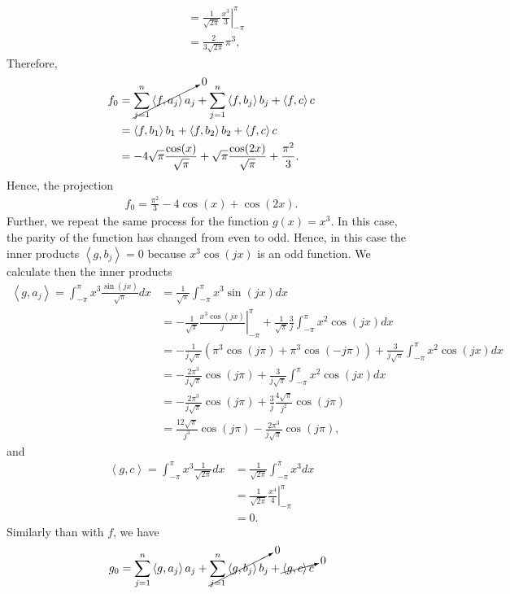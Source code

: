 \begin{questions}
\begin{solution}
\begin{align*}
&=\frac{1}{\sqrt{2\pi}}\left.\frac{x^3}{3}\right|_{-\pi}^{\pi} \\
&=\frac{2}{3\sqrt{2\pi}}\pi^3,
\end{align*}
Therefore,
\begin{align*}
f_0&=\cancelto{0}{\sum_{j=1}^n\left<f,a_j\right>a_j}+\sum_{j=1}^n\left<f,b_j\right>b_j+\left<f,c\right>c\\
&=\left<f,b_1\right>b_1+\left<f,b_2\right>b_2+\left<f,c\right>c\\
&=-4\sqrt{\pi}\frac{\cos(x)}{\sqrt{\pi}}+\sqrt{\pi}\frac{\cos(2x)}{\sqrt{\pi}}+\frac{\pi^2}{3}.
\end{align*}
Hence, the projection
\begin{align*}
f_0=\frac{\pi^2}{3}-4\cos(x)+\cos(2x).
\end{align*}
Further, we repeat the same process for the function $g(x)=x^3$. In this case, the parity of the function has changed from even to odd. Hence, in this case the inner products $\left<g,b_j\right>=0$ because $x^3\cos(jx)$ is an odd function.
We calculate then the inner products
\begin{align*}
\left<g,a_j\right>=\int_{-\pi}^{\pi}x^3\frac{\sin(jx)}{\sqrt{\pi}}dx&=\frac{1}{\sqrt{\pi}}\int_{-\pi}^{\pi}x^3\sin(jx)dx\\
&=-\frac{1}{\sqrt{\pi}}\left.\frac{x^3\cos(jx)}{j}\right|_{-\pi}^{\pi}+\frac{1}{\sqrt{\pi}}\frac{3}{j}\int_{-\pi}^{\pi}x^2\cos(jx)dx\\
&=-\frac{1}{j\sqrt{\pi}}\left(\pi^3\cos(j\pi)+\pi^3\cos(-j\pi)\right)+\frac{3}{j\sqrt{\pi}}\int_{-\pi}^{\pi}x^2\cos(jx) dx\\
&=-\frac{2\pi^3}{j\sqrt{\pi}}\cos(j\pi)+\frac{3}{j\sqrt{\pi}}\int_{-\pi}^{\pi}x^2\cos(jx) dx\\
&=-\frac{2\pi^3}{j\sqrt{\pi}}\cos(j\pi)+\frac{3}{j}\frac{4\sqrt{\pi}}{j^2}\cos(j\pi)\\
&=\frac{12\sqrt{\pi}}{j^3}\cos(j\pi)-\frac{2\pi^3}{j\sqrt{\pi}}\cos(j\pi),
\end{align*}
and
\begin{align*}
\left<g,c\right>=\int_{-\pi}^{\pi}x^3\frac{1}{\sqrt{2\pi}}dx&=\frac{1}{\sqrt{2\pi}}\int_{-\pi}^{\pi}x^3dx\\
&=\frac{1}{\sqrt{2\pi}}\left.\frac{x^4}{4}\right|_{-\pi}^{\pi}\\
&=0.
\end{align*}
Similarly than with $f$, we have
\begin{align*}
g_0&=\sum_{j=1}^n\left<g,a_j\right>a_j+\cancelto{0}{\sum_{j=1}^n\left<g,b_j\right>b_j}+\cancelto{0}{\left<g,c\right>c}\\

\end{align*}
\end{solution}
\end{questions}
